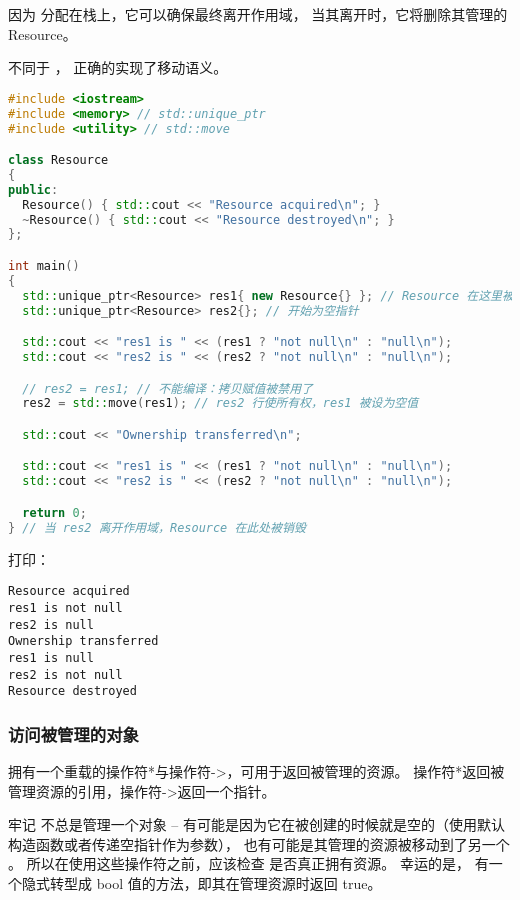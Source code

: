 \documentclass[../../LearnCpp.tex]{subfiles}
\begin{document}
因为  分配在栈上，它可以确保最终离开作用域，
当其离开时，它将删除其管理的 Resource。

不同于 ， 正确的实现了移动语义。

\begin{lstlisting}[language=C++]
#include <iostream>
#include <memory> // std::unique_ptr
#include <utility> // std::move

class Resource
{
public:
  Resource() { std::cout << "Resource acquired\n"; }
  ~Resource() { std::cout << "Resource destroyed\n"; }
};

int main()
{
  std::unique_ptr<Resource> res1{ new Resource{} }; // Resource 在这里被创建
  std::unique_ptr<Resource> res2{}; // 开始为空指针

  std::cout << "res1 is " << (res1 ? "not null\n" : "null\n");
  std::cout << "res2 is " << (res2 ? "not null\n" : "null\n");

  // res2 = res1; // 不能编译：拷贝赋值被禁用了
  res2 = std::move(res1); // res2 行使所有权，res1 被设为空值

  std::cout << "Ownership transferred\n";

  std::cout << "res1 is " << (res1 ? "not null\n" : "null\n");
  std::cout << "res2 is " << (res2 ? "not null\n" : "null\n");

  return 0;
} // 当 res2 离开作用域，Resource 在此处被销毁
\end{lstlisting}

打印：

\begin{lstlisting}
Resource acquired
res1 is not null
res2 is null
Ownership transferred
res1 is null
res2 is not null
Resource destroyed
\end{lstlisting}

\subsubsection*{访问被管理的对象}

 拥有一个重载的操作符*与操作符->，可用于返回被管理的资源。
操作符*返回被管理资源的引用，操作符->返回一个指针。

牢记  不总是管理一个对象 --
有可能是因为它在被创建的时候就是空的（使用默认构造函数或者传递空指针作为参数），
也有可能是其管理的资源被移动到了另一个 。
所以在使用这些操作符之前，应该检查  是否真正拥有资源。
幸运的是， 有一个隐式转型成 bool 值的方法，即其在管理资源时返回 true。
\end{document}

